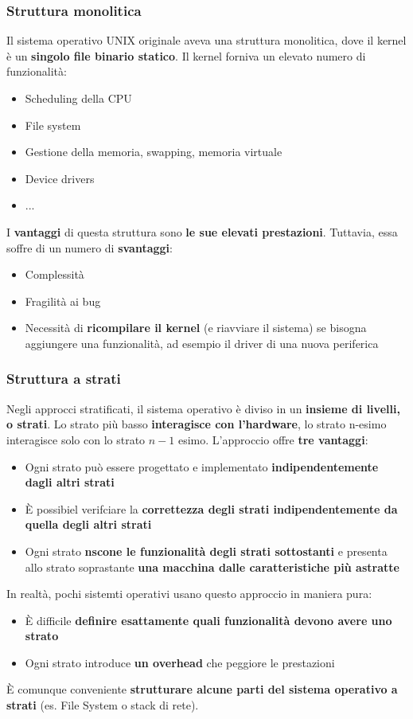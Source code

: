 \documentclass[12pt]{article}
\begin{document}
\subsubsection{Struttura monolitica}
Il sistema operativo UNIX originale aveva una struttura monolitica, dove il kernel è un \textbf{singolo file binario statico}.
Il kernel forniva un elevato numero di funzionalità:
\begin{itemize}
    \item Scheduling della CPU
    \item File system
    \item Gestione della memoria, swapping, memoria virtuale
    \item Device drivers
    \item ...
\end{itemize}
I \textbf{vantaggi} di questa struttura sono \textbf{le sue elevati prestazioni}.
Tuttavia, essa soffre di un numero di \textbf{svantaggi}:
\begin{itemize}
    \item Complessità 
    \item Fragilità ai bug
    \item Necessità di \textbf{ricompilare il kernel} (e riavviare il sistema) se bisogna aggiungere una funzionalità, ad esempio il driver di una nuova periferica
\end{itemize}
\subsubsection{Struttura a strati}
Negli approcci stratificati, il sistema operativo è diviso in un \textbf{insieme di livelli, o strati}.
Lo strato più basso \textbf{interagisce con l'hardware}, lo strato n-esimo interagisce solo con lo strato $n-1$ esimo.
L'approccio offre \textbf{tre vantaggi}:
\begin{itemize}
    \item Ogni strato può essere progettato e implementato \textbf{indipendentemente dagli altri strati}
    \item È possibiel verifciare la \textbf{correttezza degli strati indipendentemente da quella degli altri strati}
    \item Ogni strato \textbf{nscone le funzionalità degli strati sottostanti} e presenta allo strato soprastante \textbf{una macchina dalle caratteristiche più astratte}
\end{itemize}
In realtà, pochi sistemti operativi usano questo approccio in maniera pura:
\begin{itemize}
    \item È difficile \textbf{definire esattamente quali funzionalità devono avere uno strato}
    \item Ogni strato introduce \textbf{un overhead} che peggiore le prestazioni
\end{itemize}
È comunque conveniente \textbf{strutturare alcune parti del sistema operativo a strati} (es. File System o stack di rete).
\end{document}
